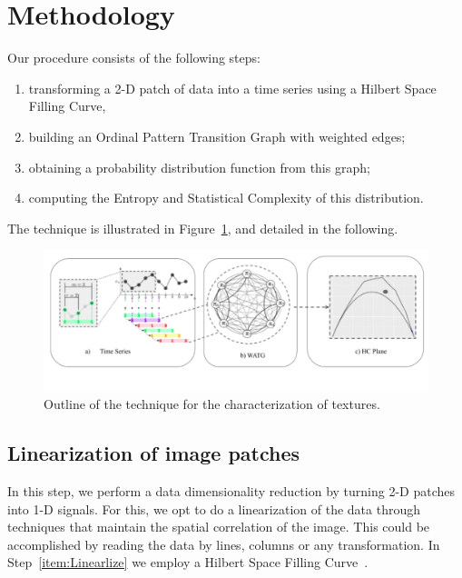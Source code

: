 \documentclass{isprs}
\begin{document}
\section{Methodology}\label{methodology}

Our procedure consists of the following steps:
\begin{enumerate}
	\item\label{item:Linearlize} transforming a 2-D patch of data into a time series using a Hilbert Space Filling Curve,
	\item\label{item:WOPTG} building an Ordinal Pattern Transition Graph with weighted edges;
	\item\label{item:Probability} obtaining a probability distribution function from this graph;
	\item\label{item:Descriptors} computing the Entropy and Statistical Complexity of this distribution.
\end{enumerate}
The technique is illustrated in Figure~\ref{fig:WATG}, and detailed in the following.

	
\begin{figure}[hbt]
	\centering
	\includegraphics[scale = 0.32]{Figures/WATG.pdf}
	\caption{Outline of the technique for the characterization of textures.}
	\label{fig:WATG}
\end{figure}

\subsection{Linearization of image patches}\label{linearization}

In this step, we perform a data dimensionality reduction by turning 2-D patches into 1-D signals.
For this, we opt to do a linearization of the data through techniques that maintain the spatial correlation of the image.
This could be accomplished by reading the data by lines, columns or any transformation.
In Step~\ref{item:Linearlize} we employ a Hilbert Space Filling Curve~\cite{Lee1994Texture}.
\end{document}
